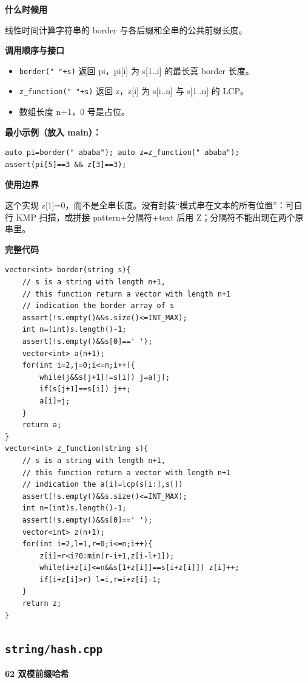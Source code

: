 \documentclass[UTF8,a4paper,10pt]{ctexart}
\newcommand{\TemplUsage}[1]{\textbf{什么时候用}\par #1\par}
\newcommand{\TemplApi}[1]{\textbf{调用顺序与接口}\par #1\par}
\newcommand{\TemplNote}[1]{\textbf{使用边界}\par #1\par}
\begin{document}
\TemplUsage{线性时间计算字符串的 border 与各后缀和全串的公共前缀长度。}
\TemplApi{\begin{itemize}
\item \texttt{border(" "+s)} 返回 pi，pi[i] 为 s[1..i] 的最长真 border 长度。
\item \texttt{z\_function(" "+s)} 返回 z，z[i] 为 s[i..n] 与 s[1..n] 的 LCP。
\item 数组长度 n+1，0 号是占位。
\end{itemize}}
\textbf{最小示例（放入 main）：}
\begin{lstlisting}
auto pi=border(" ababa"); auto z=z_function(" ababa");
assert(pi[5]==3 && z[3]==3);
\end{lstlisting}
\TemplNote{这个实现 z[1]=0，而不是全串长度。没有封装“模式串在文本的所有位置”：可自行 KMP 扫描，或拼接 pattern+分隔符+text 后用 Z；分隔符不能出现在两个原串里。}
\textbf{完整代码}
\begin{lstlisting}[firstnumber=1]
vector<int> border(string s){
	// s is a string with length n+1,
	// this function return a vector with length n+1
	// indication the border array of s
	assert(!s.empty()&&s.size()<=INT_MAX);
	int n=(int)s.length()-1;
	assert(!s.empty()&&s[0]==' ');
	vector<int> a(n+1);
	for(int i=2,j=0;i<=n;i++){
		while(j&&s[j+1]!=s[i]) j=a[j];
		if(s[j+1]==s[i]) j++;
		a[i]=j;
	}
	return a;
}
vector<int> z_function(string s){
	// s is a string with length n+1,
	// this function return a vector with length n+1
	// indication the a[i]=lcp(s[i:],s[])
	assert(!s.empty()&&s.size()<=INT_MAX);
	int n=(int)s.length()-1;
	assert(!s.empty()&&s[0]==' ');
	vector<int> z(n+1);
	for(int i=2,l=1,r=0;i<=n;i++){
		z[i]=r<i?0:min(r-i+1,z[i-l+1]);
		while(i+z[i]<=n&&s[1+z[i]]==s[i+z[i]]) z[i]++;
		if(i+z[i]>r) l=i,r=i+z[i]-1;
	}
	return z;
}
\end{lstlisting}
\par\vspace{1em}
\subsection{\texttt{string/hash.cpp}}
\textbf{62 双模前缀哈希}
\end{document}
